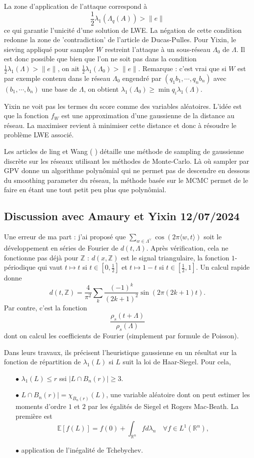 \documentclass{article}
\begin{document}
La zone d'application de l'attaque correspond à \[\frac{1}{2}\lambda_1(\Lambda_q(A)) > \|e\|\]
ce qui garantie l'unicité d'une solution de LWE. La négation de cette condition redonne la zone de 'contradiction' de l'article de Ducas-Pulles. Pour Yixin, le sieving appliqué pour sampler $W$ restreint l'attaque à un sous-réseau $\Lambda_0$ de $\Lambda$. Il est donc possible que bien que l'on ne soit pas dans la condition $\frac{1}{2}\lambda_1(\Lambda) > \|e\|$, on ait
$\frac{1}{2}\lambda_1(\Lambda_0) > \|e\|$. Remarque : c'est vrai que si $W$ est par exemple contenu dans le réseau $\Lambda_0$ engendré par $(q_1 b_1,\cdots , q_n b_n )$ avec $(b_1,\cdots , b_n )$ une base de $\Lambda$, on obtient $\lambda_1(\Lambda_0) \geq \min q_i \lambda_1(\Lambda)$.

Yixin ne voit pas les termes du score comme des variables aléatoires. L'idée est que la fonction $f_W$ est une approximation d'une gaussienne de la distance au réseau. La maximiser revient à minimiser cette distance et donc à résoudre le problème LWE associé.
 
Les articles de ling et Wang (\cite{wang2017geometric} \cite{wang2019lattice}) détaille une méthode de sampling de gaussienne discrète sur les réseaux utilisant les méthodes de Monte-Carlo. Là où sampler par GPV donne un algorithme polynômial qui ne permet pas de descendre en dessous du smoothing parameter du réseau, la méthode basée sur le MCMC permet de le faire en étant une tout petit peu plus que polynômial.
 
\subsection{Discussion avec Amaury et Yixin 12/07/2024}
 
Une erreur de ma part : j'ai proposé que $\sum_{w \in\Lambda^\vee} \cos (2\pi\langle w, t\rangle ) $ soit le développement en séries de Fourier de $d(t,\Lambda)$. Après vérification, cela ne fonctionne pas déjà pour $\mathbb Z$ : $d(x,\mathbb Z)$ est le signal triangulaire, la fonction $1$-périodique qui vaut $t\mapsto t$ si $t\in [0,\frac{1}{2}]$ et $t\mapsto 1-t$ si $t\in [\frac{1}{2},1]$. Un calcul rapide donne
\[d(t,\mathbb Z) = \frac{4}{\pi^2} \sum_{k }\frac{(-1)^k}{(2k+1)^2} \sin (2\pi (2k+1)t). \]
Par contre, c'est la fonction 
\[\frac{\rho_s(t+\Lambda)}{\rho_s(\Lambda)}\]
dont on calcul les coefficients de Fourier (simplement par formule de Poisson).    
 
Dans leurs travaux, ils précisent l'heuristique gaussienne en un résultat sur la fonction de répartition de $\lambda_1(L)$ si $L$ suit la loi de Haar-Siegel. Pour cela,
\begin{itemize}
\item[$\bullet$] $\lambda_1(L)\leq r$ ssi $|L\cap B_n(r)|\geq 3$.
\item[$\bullet$] $L\cap B_n(r)| = \chi_{B_n(r)}(L)$, une variable aléatoire dont on peut estimer les moments d'ordre $1$ et $2$ par les égalités de Siegel et Rogers Mac-Beath. La première est
\[\mathbb E[f(L) ] = f(0) + \int_{\mathbb R^n} fd\lambda_n\quad\forall f\in L^1(\mathbb R^n),\] 
\item[$\bullet$] application de l'inégalité de Tchebychev.
\end{itemize}  
\end{document}
